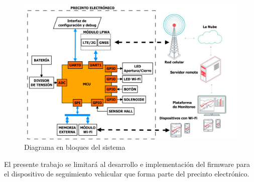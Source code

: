 \documentclass[
11pt, %
]{charter}
\begin{document}
\begin{figure}[htpb]
\centering 
\includegraphics[width=.55\textwidth, angle=270]{./Figuras/diagrama_proyecto.pdf}
\caption{Diagrama en bloques del sistema}
\label{fig:diagBloques}
\end{figure}

El presente trabajo se limitará al desarrollo e implementación del firmware para el dispositivo de seguimiento vehicular que forma parte del precinto electrónico. 
\end{document}
